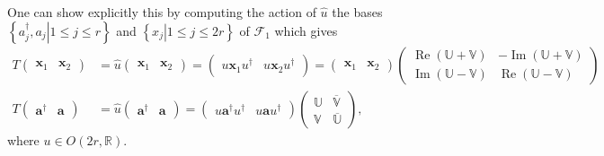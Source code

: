 \documentclass[aps, preprint]{revtex4}
\begin{document}
\begin{enumerate}
One can show explicitly this by computing the action of $\widehat{u}$ the bases $\left \{\left .a_{j}^{ \dag } ,a_{j}\right \vert 1 \leq j \leq r\text{}\right \}$ and $\left \{\left .x_{j}\right \vert 1 \leq j \leq 2 r\text{}\right \}$ of $\mathcal{F}_{1}$ which gives
\begin{align}T \left (\begin{array}{cc}\mathbf{x}_{1} & \mathbf{x}_{2}\end{array}\right ) &  =\widehat{u} \left (\begin{array}{cc}\mathbf{x}_{1} & \mathbf{x}_{2}\end{array}\right ) =\left (\begin{array}{cc}u \mathbf{x}_{1} u^{ \dag } & u \mathbf{x}_{2} u^{ \dag }\end{array}\right ) =\left (\begin{array}{cc}\mathbf{x}_{1} & \mathbf{x}_{2}\end{array}\right ) \left (\begin{array}{cc}\ensuremath{\operatorname*{Re}} \left (\mathbb{U} +\mathbb{V}\right ) &  -\ensuremath{\operatorname*{Im}} \left (\mathbb{U} +\mathbb{V}\right ) \\
\ensuremath{\operatorname*{Im}} \left (\mathbb{U} -\mathbb{V}\right ) & \ensuremath{\operatorname*{Re}} \left (\mathbb{U} -\mathbb{V}\right )\end{array}\right ) \\
T \left (\begin{array}{cc}\mathbf{a}^{ \dag } & \mathbf{a}\end{array}\right ) &  =\widehat{u} \left (\begin{array}{cc}\mathbf{a}^{ \dag } & \mathbf{a}\end{array}\right ) =\left (\begin{array}{cc}u \mathbf{a}^{ \dag } u^{ \dag } & u \mathbf{a} u^{ \dag }\end{array}\right ) \left (\begin{array}{cc}\mathbb{U} & \overline{\mathbb{V}} \\
\mathbb{V} & \overline{\mathbb{U}}\end{array}\right )\text{,}\end{align}where $u \in O \left (2 r ,\mathbb{R}\right )\text{.}$ \end{enumerate}
\end{document}
